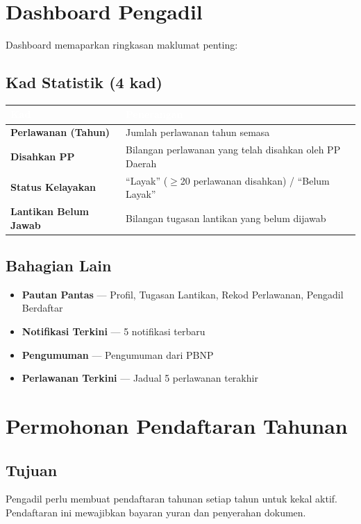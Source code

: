 \documentclass[12pt,a4paper]{report}
\begin{document}
\section{Dashboard Pengadil}

Dashboard memaparkan ringkasan maklumat penting:

\subsection{Kad Statistik (4 kad)}

\begin{table}[H]
\centering
{}
\begin{tabularx}{\textwidth}{l X}
\toprule
\rowcolor{tableheader}
\textcolor{white}{\textbf{Kad}} & \textcolor{white}{\textbf{Penerangan}} \\
\midrule
\textbf{Perlawanan (Tahun)} & Jumlah perlawanan tahun semasa \\
\textbf{Disahkan PP} & Bilangan perlawanan yang telah disahkan oleh PP Daerah \\
\textbf{Status Kelayakan} & ``Layak'' ($\geq$20 perlawanan disahkan) / ``Belum Layak'' \\
\textbf{Lantikan Belum Jawab} & Bilangan tugasan lantikan yang belum dijawab \\
\bottomrule
\end{tabularx}
\end{table}

\subsection{Bahagian Lain}
\begin{itemize}[label=\textcolor{pbnpblue}{\faChevronRight}]
  \item \textbf{Pautan Pantas} --- Profil, Tugasan Lantikan, Rekod Perlawanan, Pengadil Berdaftar
  \item \textbf{Notifikasi Terkini} --- 5 notifikasi terbaru
  \item \textbf{Pengumuman} --- Pengumuman dari PBNP
  \item \textbf{Perlawanan Terkini} --- Jadual 5 perlawanan terakhir
\end{itemize}

\section{Permohonan Pendaftaran Tahunan}

\subsection{Tujuan}
Pengadil perlu membuat pendaftaran tahunan setiap tahun untuk kekal aktif. Pendaftaran ini mewajibkan bayaran yuran dan penyerahan dokumen.
\end{document}
